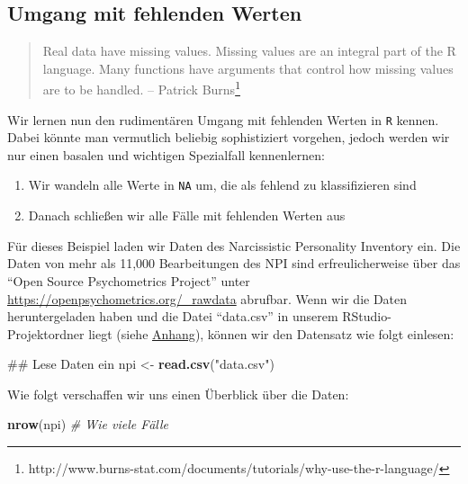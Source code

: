\documentclass[12pt,]{tufte-book}
\newenvironment{Shaded}{\begin{snugshade}}{\end{snugshade}}
\newcommand{\KeywordTok}[1]{\textcolor[rgb]{0.13,0.29,0.53}{\textbf{#1}}}
\newcommand{\StringTok}[1]{\textcolor[rgb]{0.31,0.60,0.02}{#1}}
\newcommand{\CommentTok}[1]{\textcolor[rgb]{0.56,0.35,0.01}{\textit{#1}}}
\newcommand{\NormalTok}[1]{#1}
\providecommand{\tightlist}{%
  \setlength{\itemsep}{0pt}\setlength{\parskip}{0pt}}
\theoremstyle{definition}
\theoremstyle{definition}
\theoremstyle{definition}
\theoremstyle{remark}
\begin{document}
\subsection{Umgang mit fehlenden
Werten}\label{umgang-mit-fehlenden-werten}

\begin{quote}
Real data have missing values. Missing values are an integral part of
the R language. Many functions have arguments that control how missing
values are to be handled. -- Patrick Burns\footnote{http://www.burns-stat.com/documents/tutorials/why-use-the-r-language/}
\end{quote}

Wir lernen nun den rudimentären Umgang mit fehlenden Werten in
\texttt{R} kennen. Dabei könnte man vermutlich beliebig sophistiziert
vorgehen, jedoch werden wir nur einen basalen und wichtigen Spezialfall
kennenlernen:

\begin{enumerate}
\def\labelenumi{\arabic{enumi}.}
\tightlist
\item
  Wir wandeln alle Werte in \texttt{NA} um, die als fehlend zu
  klassifizieren sind
\item
  Danach schließen wir alle Fälle mit fehlenden Werten aus
\end{enumerate}

Für dieses Beispiel laden wir Daten des Narcissistic Personality
Inventory \citep[NPI;][]{raskin1988} ein. Die Daten von mehr als 11,000
Bearbeitungen des NPI sind erfreulicherweise über das ``Open Source
Psychometrics Project'' unter
\url{https://openpsychometrics.org/_rawdata} abrufbar. Wenn wir die
Daten heruntergeladen haben und die Datei ``data.csv'' in unserem
RStudio-Projektordner liegt (siehe
\protect\hyperlink{datenEinlesen}{Anhang}), können wir den Datensatz wie
folgt einlesen:

\begin{Shaded}
\begin{Highlighting}[]
\NormalTok{## Lese Daten ein}
\NormalTok{npi <-}\StringTok{ }\KeywordTok{read.csv}\NormalTok{(}\StringTok{"data.csv"}\NormalTok{)}
\end{Highlighting}
\end{Shaded}

Wie folgt verschaffen wir uns einen Überblick über die Daten:

\begin{Shaded}
\begin{Highlighting}[]
\KeywordTok{nrow}\NormalTok{(npi)  }\CommentTok{# Wie viele Fälle}
\end{Highlighting}
\end{Shaded}
\end{document}
